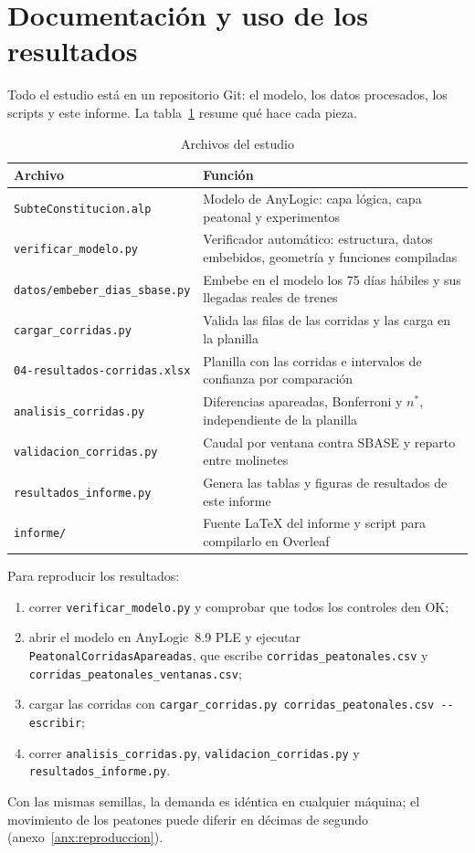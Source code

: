 \section{Documentación y uso de los resultados}
\label{anx:documentacion}

Todo el estudio está en un repositorio Git: el modelo, los datos procesados, los scripts y este informe. La
tabla~\ref{tab:archivos} resume qué hace cada pieza.

\begin{table}[H]
\centering
\caption{Archivos del estudio}
\label{tab:archivos}
\small
\begin{tabularx}{\textwidth}{@{}>{\raggedright\arraybackslash}p{4.6cm} X@{}}
\toprule
Archivo & Función \\
\midrule
\texttt{SubteConstitucion.alp} & Modelo de AnyLogic: capa lógica, capa peatonal y experimentos \\
\texttt{verificar\_modelo.py} & Verificador automático: estructura, datos embebidos, geometría y funciones compiladas \\
\texttt{datos/embeber\_dias\_sbase.py} & Embebe en el modelo los 75 días hábiles y sus llegadas reales de trenes \\
\texttt{cargar\_corridas.py} & Valida las filas de las corridas y las carga en la planilla \\
\texttt{04-resultados-corridas.xlsx} & Planilla con las corridas e intervalos de confianza por comparación \\
\texttt{analisis\_corridas.py} & Diferencias apareadas, Bonferroni y $n^{*}$, independiente de la planilla \\
\texttt{validacion\_corridas.py} & Caudal por ventana contra SBASE y reparto entre molinetes \\
\texttt{resultados\_informe.py} & Genera las tablas y figuras de resultados de este informe \\
\texttt{informe/} & Fuente \LaTeX{} del informe y script para compilarlo en Overleaf \\
\bottomrule
\end{tabularx}
\end{table}

Para reproducir los resultados:
\begin{enumerate}
  \item correr \texttt{verificar\_modelo.py} y comprobar que todos los controles den OK;
  \item abrir el modelo en AnyLogic~8.9 PLE y ejecutar \texttt{PeatonalCorridasApareadas}, que escribe
        \texttt{corridas\_peatonales.csv} y \texttt{corridas\_peatonales\_ventanas.csv};
  \item cargar las corridas con \texttt{cargar\_corridas.py corridas\_peatonales.csv -{}-escribir};
  \item correr \texttt{analisis\_corridas.py}, \texttt{validacion\_corridas.py} y \texttt{resultados\_informe.py}.
\end{enumerate}
Con las mismas semillas, la demanda es idéntica en cualquier máquina; el movimiento de los peatones puede
diferir en décimas de segundo (anexo~\ref{anx:reproduccion}).

